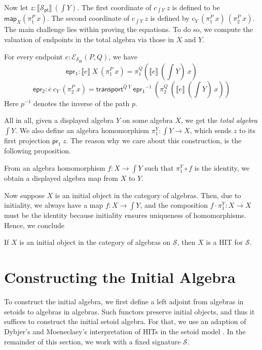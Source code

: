 \documentclass[9pt]{entcs}
\newcommand{\term}[1]{\mathsf{#1}}
\newcommand{\function}[1]{\mathsf{#1}}
\newcommand{\0}{\textbf{0}} %
\newcommand{\prl}{\term{pr}_1} %
\newcommand{\transport}[2]{\function{transport}^{#1} \> #2} %
\newcommand{\invP}[1]{#1^{-1}} %
\newcommand{\compm}[2]{#2 \circ #1} %
\newcommand{\ep}[3]{\mathcal{E}_{#1}(#2,#3)} %
\newcommand{\comp}[2]{#1 \cdot #2} %
\newcommand{\pt}[0]{\textsf{pt}}
\newcommand{\pointc}[1]{#1_{\pt}} %
\newcommand{\sig}{\mathcal{S}} %
\newcommand{\semP}[1]{\llbracket #1 \rrbracket} %
\newcommand{\semE}[1]{\llbracket #1 \rrbracket} %
\newcommand{\constrA}[1]{\function{map}_{#1}} %
\newcommand{\polydact}[2]{\overline{#1} \> #2} %
\newcommand{\epdact}[2]{\overline{#1} \> #2} %
\newcommand{\total}[1]{\int #1} %
\newcommand{\proj}[1]{\pi_1^{#1}} %
\newcommand{\Ppl}[1]{\pi_1^{#1}} %
\newcommand{\Ppr}[1]{\pi_2^{#1}} %
\newcommand{\Epl}{\function{epr_1}} %
\newcommand{\Epr}{\function{epr_2}} %
\begin{document}
Now let $z : \semP{\pointc{\sig}} \> (\total{Y})$.
The first coordinate of $c_{\total{Y}} \> z$ is defined to be $\constrA{X}(\Ppl{P} \> x)$.
The second coordinate of $c_{\total{Y}} \> z$ is defined by $c_Y \> (\Ppl{P} \> x) \> (\Ppr{P} \> x)$.
The main challenge lies within proving the equations.
To do so, we compute the valuation of endpoints in the total algebra via those in $X$ and $Y$.

\begin{lemma}
For every endpoint $e : \ep{\pointc{\sig}}{P}{Q}$, we have
\[
\Epl : \semE{e} \> X \> (\Ppl{P} \> x) = \Ppl{Q}(\semE{e} \> (\total{Y}) \> x) 
\]
\[
\Epr : \epdact{e}{c_Y} \> (\Ppr{P} \> x) = \transport{\polydact{Q}{Y}}{\invP{\Epl}} \> (\Ppr{Q} \> (\semE{e} \> (\total{Y}) \> x))
\]
Here $\invP{p}$ denotes the inverse of the path $p$.
\end{lemma}

All in all, given a displayed algebra $Y$ on some algebra $X$, we get the \emph{total algebra} $\total{Y}$.
We also define an algebra homomorphism $\proj{Y} : \total{Y} \rightarrow X$, which sends $z$ to its first projection $\prl \> z$.
The reason why we care about this construction, is the following proposition.

\begin{proposition}
From an algebra homomorphism $f : X \rightarrow \total{Y}$ such that $\compm{f}{\proj{Y}}$ is the identity, we obtain a displayed algebra map from $X$ to $Y$.
\end{proposition}

Now suppose $X$ is an initial object in the category of algebras.
Then, due to initiality, we always have a map $f : X \rightarrow \total{Y}$, and the composition $\comp{f}{\proj{Y}} : X \rightarrow X$ must be the identity because initiality ensures uniqueness of homomorphisms.
Hence, we conclude

\begin{corollary}
If $X$ is an initial object in the category of algebras on $\sig$, then $X$ is a HIT for $\sig$.
\end{corollary}

\section{Constructing the Initial Algebra}
\label{sec:construction}
To construct the initial algebra, we first define a left adjoint from algebras in setoids to algebras in algebras.
Such functors preserve initial objects, and thus it suffices to construct the initial setoid algebra.
For that, we use an adaption of Dybjer's and Moeneclaey's interpretation of HITs in the setoid model \cite{DybjerM18,moeneclaey2016schema}.
In the remainder of this section, we work with a fixed signature $\sig$.
\end{document}
